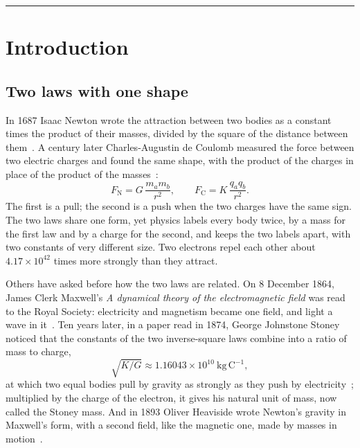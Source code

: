 \documentclass[11pt,a4paper]{article}
\theoremstyle{plain}
\theoremstyle{definition}
\theoremstyle{remark}
\begin{document}
\begin{center}\rule{0.6\textwidth}{0.4pt}\end{center}

\section{Introduction}\label{sec:intro}

\subsection{Two laws with one shape}\label{subsec:two-laws}

In 1687 Isaac Newton wrote the attraction between two bodies as a constant times the product of their masses, divided by the square of the distance between them~\citep{Newton1687}. A century later Charles-Augustin de Coulomb measured the force between two electric charges and found the same shape, with the product of the charges in place of the product of the masses~\citep{Coulomb1785}:
\begin{equation}\label{eq:two-laws}
F_{\mathrm{N}} = G\,\frac{m_a m_b}{r^2} , \qquad F_{\mathrm{C}} = K\,\frac{q_a q_b}{r^2} .
\end{equation}
The first is a pull; the second is a push when the two charges have the same sign. The two laws share one form, yet physics labels every body twice, by a mass for the first law and by a charge for the second, and keeps the two labels apart, with two constants of very different size. Two electrons repel each other about $4.17 \times 10^{42}$ times more strongly than they attract.

Others have asked before how the two laws are related. On 8 December 1864, James Clerk Maxwell's \emph{A dynamical theory of the electromagnetic field} was read to the Royal Society: electricity and magnetism became one field, and light a wave in it~\citep{Maxwell1865}. Ten years later, in a paper read in 1874, George Johnstone Stoney noticed that the constants of the two inverse-square laws combine into a ratio of mass to charge,
\begin{equation}\label{eq:stoney-ratio}
\sqrt{K/G} \approx 1.16043 \times 10^{10}\ \mathrm{kg\,C^{-1}} ,
\end{equation}
at which two equal bodies pull by gravity as strongly as they push by electricity~\citep{Stoney1881,CODATA2022}; multiplied by the charge of the electron, it gives his natural unit of mass, now called the Stoney mass. And in 1893 Oliver Heaviside wrote Newton's gravity in Maxwell's form, with a second field, like the magnetic one, made by masses in motion~\citep{Heaviside1893}.
\end{document}
